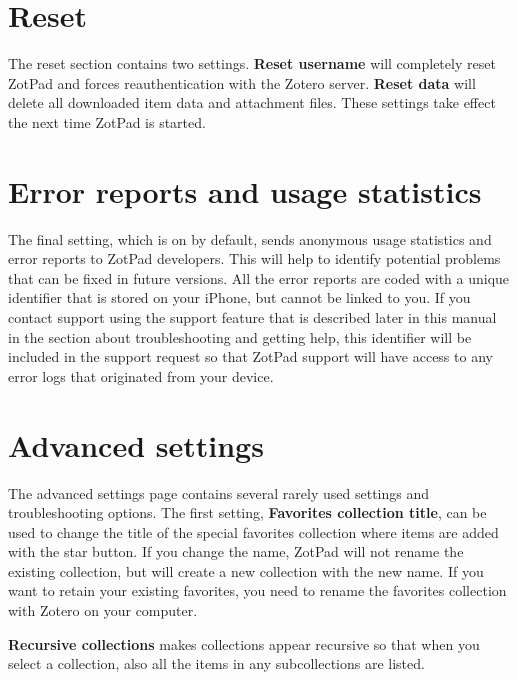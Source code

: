 \documentclass[oneside, openany, 12pt]{tufte-book}
\newcommand{\iphone}[1]{#1}
\newcommand{\ipad}[1]{}
\newcommand{\ipadfootnote}[1]{}
\newcommand{\iphone}[1]{}
\newcommand{\ipad}[1]{#1}
\newcommand{\ipadfootnote}[1]{\footnote{#1}}
\begin{document}
\section{Reset}

The reset section contains two settings. \textbf{Reset username} will completely reset ZotPad and forces reauthentication with the Zotero server. \textbf{Reset data} will delete all downloaded item data and attachment files. These settings take effect the next time ZotPad is started.

\section{Error reports and usage statistics}

The final setting, which is on by default, sends anonymous usage statistics and error reports to ZotPad developers. This will help to identify potential problems that can be fixed in future versions. All the error reports are coded with a unique identifier that is stored on your \ipad{iPad}\iphone{iPhone}, but cannot be linked to you. If you contact support using the support feature that is described later in this manual in the section about troubleshooting and getting help, this identifier will be included in the support request so that ZotPad support will have access to any error logs that originated from your device.

\section{Advanced settings}

The advanced settings page contains several rarely used settings and troubleshooting options. The first setting, \textbf{Favorites collection title}, can be used to change the title of the special favorites collection where items are added with the star button. If you change the name, ZotPad will not rename the existing collection, but will create a new collection with the new name. If you want to retain your existing favorites, you need to rename the favorites collection with Zotero on your computer. 

\textbf{Recursive collections} makes collections appear recursive so that when you select a collection, also all the items in any subcollections are listed\ipadfootnote{The recursive collection preference for Zotero is described in Zotero documentation. Recursion is implemented only cached items, which means that some items in the subcollections may not be displayed before the cache has been fully updated. However, this should be rare.  \url{http://www.zotero.org/support/preferences/hidden_preferences}}. \ipad{\textbf{Unified collection navigation} removes the blue collection navigation arrows from the library and collection list and combines selecting a library or collection and opening its subcollections into a single action.}
\end{document}
